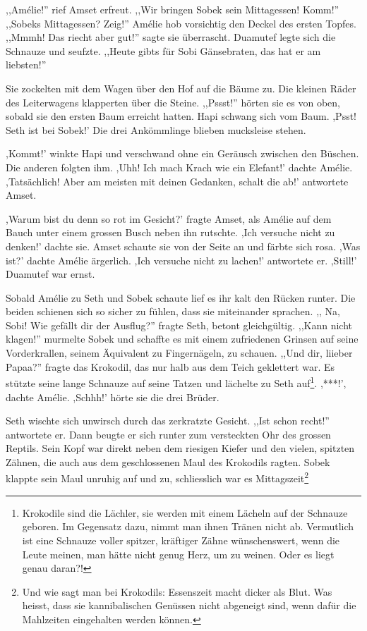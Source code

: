 \documentclass[11pt,titlepage,a5paper]{book}
\begin{document}
,,Amélie!'' rief Amset erfreut. ,,Wir bringen Sobek sein Mittagessen! Komm!'' ,,Sobeks Mittagessen? Zeig!'' Amélie hob vorsichtig den Deckel des ersten Topfes. ,,Mmmh! Das riecht aber gut!'' sagte sie überrascht. Duamutef legte sich die Schnauze und seufzte. ,,Heute gibts für Sobi Gänsebraten, das hat er am liebsten!''

Sie zockelten mit dem Wagen über den Hof auf die Bäume zu. Die kleinen Räder des Leiterwagens klapperten über die Steine. ,,Pssst!'' hörten sie es von oben, sobald sie den ersten Baum erreicht hatten. Hapi schwang sich vom Baum. ,Psst! Seth ist bei Sobek!' Die drei Ankömmlinge blieben mucksleise stehen. 

,Kommt!' winkte Hapi und verschwand ohne ein Geräusch zwischen den Büschen. Die anderen folgten ihm. ,Uhh! Ich mach Krach wie ein Elefant!' dachte Amélie. ,Tatsächlich! Aber am meisten mit deinen Gedanken, schalt die ab!' antwortete Amset.

,Warum bist du denn so rot im Gesicht?' fragte Amset, als Amélie  auf dem Bauch unter einem grossen Busch neben ihn rutschte. ,Ich versuche nicht zu denken!' dachte sie. Amset schaute sie von der Seite an und färbte sich rosa. ,Was ist?' dachte Amélie ärgerlich. ,Ich versuche nicht zu lachen!' antwortete er. ,Still!' Duamutef war ernst.

Sobald Amélie zu Seth und Sobek schaute lief es ihr kalt den Rücken runter. Die beiden schienen sich so sicher zu fühlen, dass sie miteinander sprachen. ,, Na, Sobi! Wie gefällt dir der Ausflug?'' fragte Seth, betont gleichgültig. ,,Kann nicht klagen!'' murmelte Sobek und schaffte es mit einem zufriedenen Grinsen auf seine Vorderkrallen, seinem Äquivalent zu Fingernägeln, zu schauen. ,,Und dir, liieber Papaa?'' fragte das Krokodil, das nur halb aus dem Teich geklettert war. Es stützte seine lange Schnauze auf seine Tatzen und lächelte zu Seth auf\footnote{Krokodile sind die Lächler, sie werden mit einem Lächeln auf der Schnauze geboren. Im Gegensatz dazu, nimmt man ihnen Tränen nicht ab. Vermutlich ist eine Schnauze voller spitzer, kräftiger Zähne wünschenswert, wenn die Leute meinen, man hätte nicht genug Herz, um zu weinen. Oder es liegt genau daran?!}. ,***!', dachte Amélie. ,Schhh!' hörte sie die drei Brüder.

Seth wischte sich unwirsch durch das zerkratzte Gesicht. ,,Ist schon recht!'' antwortete er. Dann beugte er sich runter zum versteckten Ohr des grossen Reptils. Sein Kopf war direkt neben dem riesigen Kiefer und den vielen, spitzten Zähnen, die auch aus dem geschlossenen Maul des Krokodils ragten. Sobek klappte sein Maul unruhig auf und zu, schliesslich war es Mittagszeit\footnote{Und wie sagt man bei Krokodils: Essenszeit macht dicker als Blut. Was heisst, dass sie kannibalischen Genüssen nicht abgeneigt sind, wenn dafür die Mahlzeiten eingehalten werden können.}
\end{document}

